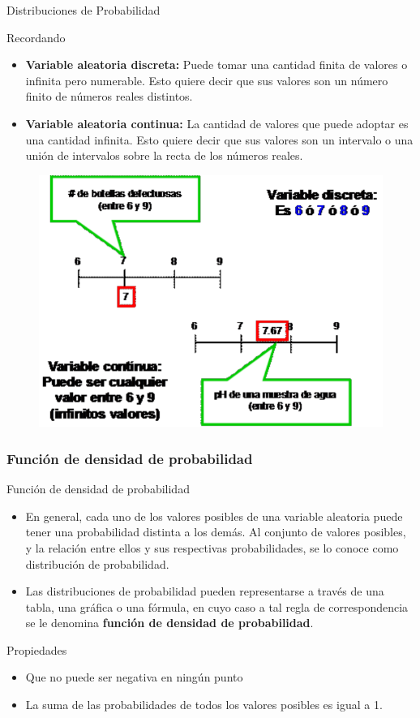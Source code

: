 \documentclass[11pt]{beamer}
\begin{document}
        \begin{frame}{Distribuciones de Probabilidad}
            \begin{block}{Recordando}
                \begin{itemize}
                    \item \textbf{Variable aleatoria discreta:} Puede tomar una cantidad finita de valores o infinita pero numerable. Esto quiere decir que sus valores son un número finito de números reales distintos.
                    \item  \textbf{Variable aleatoria continua:} La cantidad de valores que puede adoptar es una cantidad infinita. Esto quiere decir que sus valores son un intervalo o una unión de intervalos sobre la recta de los números reales.
                \end{itemize}
            \end{block}
            \begin{figure}
                \centering
                \includegraphics[width=0.3\linewidth]{images/estadistica8}
                \label{fig:estadistica8}
            \end{figure}

        \end{frame}

        \subsubsection*{Función de densidad de probabilidad}
        \begin{frame}{Función de densidad de probabilidad}
            \begin{itemize}
                \item En general, cada uno de los valores posibles de una variable aleatoria puede tener una probabilidad distinta a los demás. Al conjunto de valores posibles, y la relación entre ellos y sus respectivas probabilidades, se lo conoce como distribución de probabilidad.
                \item Las distribuciones de probabilidad pueden representarse a través de una tabla, una gráfica o una fórmula, en cuyo caso a tal regla de correspondencia se le denomina \textbf{función de densidad de probabilidad}.
            \end{itemize}
            \begin{block}{Propiedades}
                \begin{itemize}
                    \item Que no puede ser negativa en ningún punto
                    \item La suma de las probabilidades de todos los valores posibles es igual a 1.
                \end{itemize}
            \end{block}
        \end{frame}
\end{document}
